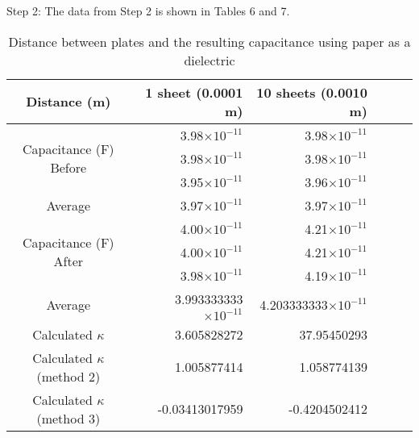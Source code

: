 \documentclass [12pt, letterpaper, twoside] {article}
\begin{document}
\noindent
Step 2: The data from Step 2 is shown in Tables 6 and 7.
\begin{table}[h!]
  \centering
  \begin{tabular}{| c | r | r | r | r | r |}
    \hline\hline
    Distance (m) & 1 sheet (0.0001 m) & 10 sheets (0.0010 m) \\
    \hline
    \multirow {3}{*}{Capacitance (F) Before} & 3.98\(\times10^{-11}\) & 3.98\(\times10^{-11}\) \\
    & 3.98\(\times10^{-11}\) & 3.98\(\times10^{-11}\) \\
    & 3.95\(\times10^{-11}\) & 3.96\(\times10^{-11}\) \\
    \hline
    Average & 3.97\(\times10^{-11}\) & 3.97\(\times10^{-11}\) \\
    \hline
    \multirow {3}{*}{Capacitance (F) After} & 4.00\(\times10^{-11}\) & 4.21\(\times10^{-11}\) \\
    & 4.00\(\times10^{-11}\) & 4.21\(\times10^{-11}\) \\
    & 3.98\(\times10^{-11}\) & 4.19\(\times10^{-11}\) \\
    \hline
    Average & 3.993333333\(\times10^{-11}\) & 4.203333333\(\times10^{-11}\) \\
    \hline
    Calculated \(\kappa\) & 3.605828272 & 37.95450293 \\
    \hline
    Calculated \(\kappa\) (method 2) & 1.005877414 & 1.058774139 \\
    \hline
    Calculated \(\kappa\) (method 3) & -0.03413017959 & -0.4204502412 \\
    \hline\hline
  \end{tabular}
  \caption{Distance between plates and the resulting capacitance using paper as a dielectric}
\end{table}
\end{document}
